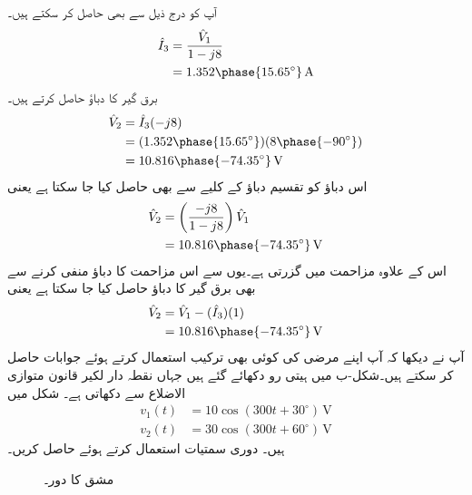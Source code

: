آپ  کو درج ذیل سے بھی حاصل کر سکتے ہیں۔
\begin{align*}
\hat{I}_3&=\frac{\hat{V}_1}{1-j8}\\
&=1.352\phase{15.65^{\circ}}\,\si{\ampere}
\end{align*}
برق گیر کا دباؤ حاصل کرتے ہیں۔
\begin{align*}
\hat{V}_2&=\hat{I}_3 (-j8)\\
&=(1.352\phase{15.65^{\circ}})(8\phase{-90^{\circ}})\\
&=10.816\phase{-74.35^{\circ}}\,\si{\volt}
\end{align*}
اس دباؤ کو تقسیم دباؤ کے کلیے سے بھی حاصل کیا جا سکتا ہے یعنی
\begin{align*}
\hat{V}_2&=\left(\frac{-j8}{1-j8}\right) \hat{V}_1\\
&=10.816\phase{-74.35^{\circ}}\,\si{\volt}
\end{align*}
اس کے علاوہ   مزاحمت میں  گزرتی ہے۔یوں  سے اس مزاحمت کا دباؤ منفی کرنے سے بھی برق گیر کا دباؤ حاصل کیا جا سکتا ہے یعنی
\begin{align*}
\hat{V}_2&=\hat{V}_1-(\hat{I}_3)(1)\\
&=10.816\phase{-74.35^{\circ}}\,\si{\volt}
\end{align*}
آپ نے دیکھا کہ آپ اپنے مرضی کی کوئی بھی ترکیب استعمال کرتے ہوئے جوابات حاصل کر سکتے ہیں۔شکل-ب میں ہیتی رو دکھائے گئے ہیں جہاں نقطہ دار لکیر قانون متوازی الاضلاع سے  دکھاتی ہے۔
شکل  میں
\begin{align*}
v_1(t)&=10\cos(300t+30^{\circ}) \, \si{\volt}\\
v_2(t)&=30\cos(300t+60^{\circ})\,\si{\volt}
\end{align*}
ہیں۔ دوری سمتیات استعمال کرتے ہوئے  حاصل کریں۔
\begin{figure}
\centering
{}
\caption{مشق  کا دور۔}
\label{شکل_بدلتا_کرخوف_بدلتی_رو_الف}
\end{figure}

